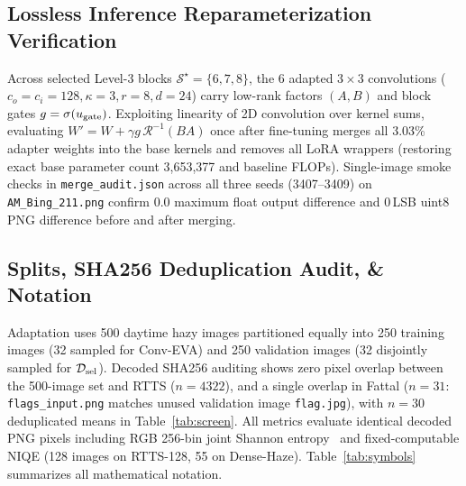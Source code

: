 \documentclass[10pt,twocolumn,letterpaper]{article}
\begin{document}
\subsection{Lossless Inference Reparameterization Verification}
Across selected Level-3 blocks $\mathcal{S}^\star=\{6,7,8\}$, the 6 adapted $3\times 3$ convolutions ($c_o=c_i=128,\kappa=3,r=8,d=24$) carry low-rank factors $(A,B)$ and block gates $g=\sigma(u_{\rm gate})$. Exploiting linearity of 2D convolution over kernel sums, evaluating $W' = W + \gamma g\,\mathcal{R}^{-1}(BA)$ once after fine-tuning merges all 3.03\% adapter weights into the base kernels and removes all LoRA wrappers (restoring exact base parameter count 3,653,377 and baseline FLOPs). Single-image smoke checks in \texttt{merge\_audit.json} across all three seeds (3407--3409) on \texttt{AM\_Bing\_211.png} confirm 0.0 maximum float output difference and 0\,LSB uint8 PNG difference before and after merging.

\subsection{Splits, SHA256 Deduplication Audit, \& Notation}
Adaptation uses 500 daytime hazy images partitioned equally into 250 training images (32 sampled for Conv-EVA) and 250 validation images (32 disjointly sampled for $\mathcal{D}_{\rm sel}$). Decoded SHA256 auditing shows zero pixel overlap between the 500-image set and RTTS ($n=4322$), and a single overlap in Fattal ($n=31$: \texttt{flags\_input.png} matches unused validation image \texttt{flag.jpg}), with $n=30$ deduplicated means in Table~\ref{tab:screen}. All metrics evaluate identical decoded PNG pixels including RGB 256-bin joint Shannon entropy~\cite{shannon1948} and fixed-computable NIQE (128 images on RTTS-128, 55 on Dense-Haze). Table~\ref{tab:symbols} summarizes all mathematical notation.
\end{document}

